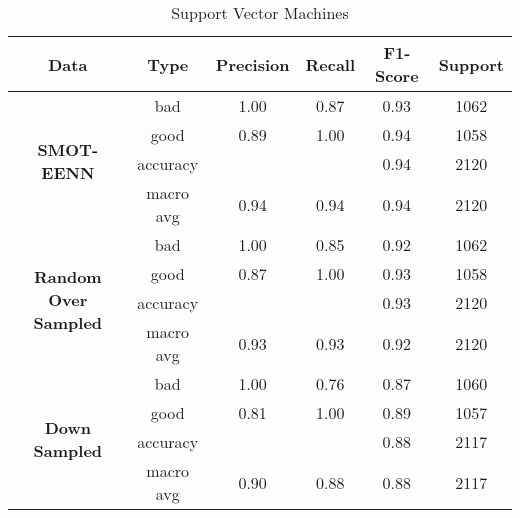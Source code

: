 \documentclass[conference]{IEEEtran}
\begin{document}
    \begin{table}[!t]
        \renewcommand{\arraystretch}{1.25}
        \caption{Support Vector Machines}
        \label{table:svm}
        \centering
        \begin{tabular}{ |c|c|c|c|c|c| }
            \hline
                \textbf{Data} & \textbf{Type} & \textbf{Precision} & \textbf{Recall} & \textbf{F1-Score} & \textbf{Support} \\
            \hline
                \multirow{4}{1.1cm}{\centering \textbf{SMOT-EENN}} & bad & 1.00 & 0.87 & 0.93 & 1062 \\
            \cline{2-6}
                 & good & 0.89 & 1.00 & 0.94 & 1058\\
            \cline{2-6}
                 & accuracy &  &  & 0.94 & 2120 \\
            \cline{2-6}
                 & macro avg & 0.94 & 0.94 & 0.94 & 2120 \\
            \hline
                \multirow{4}{1.1cm}{\centering \textbf{Random Over Sampled}} & bad & 1.00 & 0.85 & 0.92 & 1062 \\
            \cline{2-6}
                 & good & 0.87 & 1.00 & 0.93 & 1058 \\
            \cline{2-6}
                 & accuracy &  &  & 0.93 & 2120 \\
            \cline{2-6}
                 & macro avg & 0.93 & 0.93 & 0.92 & 2120 \\
            \hline
                \multirow{4}{1.1cm}{\centering \textbf{ \textbf{Down Sampled}}} & bad & 1.00 & 0.76 & 0.87 & 1060 \\
            \cline{2-6}
                 & good & 0.81 & 1.00 & 0.89 & 1057 \\
            \cline{2-6}
                 & accuracy &  &  & 0.88 & 2117 \\
            \cline{2-6}
                 & macro avg & 0.90 & 0.88 & 0.88 & 2117 \\
            \hline
        \end{tabular}
    \end{table}
\end{document}
